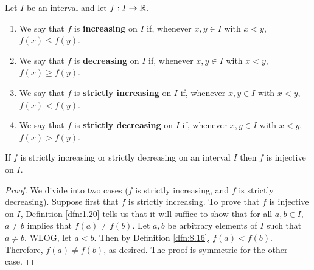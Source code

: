 \documentclass[../main.tex]{subfiles}
\begin{document}
\begin{definition}\label{dfn:8.16}
    Let $I$ be an interval and let $f:I\to\mathbb{R}$.
    \begin{enumerate}[label={\alph*)}]
        \item We say that $f$ is \textbf{increasing} on $I$ if, whenever $x,y\in I$ with $x<y$, $f(x)\leq f(y)$.
        \item We say that $f$ is \textbf{decreasing} on $I$ if, whenever $x,y\in I$ with $x<y$, $f(x)\geq f(y)$.
        \item We say that $f$ is \textbf{strictly increasing} on $I$ if, whenever $x,y\in I$ with $x<y$, $f(x)<f(y)$.
        \item We say that $f$ is \textbf{strictly decreasing} on $I$ if, whenever $x,y\in I$ with $x<y$, $f(x)>f(y)$.
    \end{enumerate}
\end{definition}

\begin{lemma}\label{lem:8.17}
    If $f$ is strictly increasing or strictly decreasing on an interval $I$ then $f$ is injective on $I$.
    \begin{proof}
        We divide into two cases ($f$ is strictly increasing, and $f$ is strictly decreasing). Suppose first that $f$ is strictly increasing. To prove that $f$ is injective on $I$, Definition \ref{dfn:1.20} tells us that it will suffice to show that for all $a,b\in I$, $a\neq b$ implies that $f(a)\neq f(b)$. Let $a,b$ be arbitrary elements of $I$ such that $a\neq b$. WLOG, let $a<b$. Then by Definition \ref{dfn:8.16}, $f(a)<f(b)$. Therefore, $f(a)\neq f(b)$, as desired. The proof is symmetric for the other case.
    \end{proof}
\end{lemma}
\end{document}
